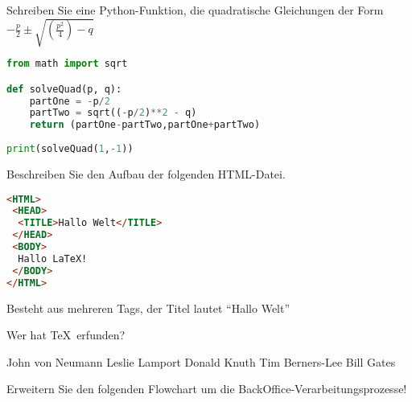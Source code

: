 \documentclass[addpoints,12pt,ngerman,answers]{exam}
\begin{document}
\begin{questions}
\question[5]
Schreiben Sie eine Python-Funktion, die quadratische Gleichungen der Form $-\frac{p}{2}\pm \sqrt{ \left(\frac{p^2}{4}\right)-q}$

\begin{solution}
\begin{lstlisting}[language=Python]
from math import sqrt

def solveQuad(p, q):
    partOne = -p/2
    partTwo = sqrt((-p/2)**2 - q)
    return (partOne-partTwo,partOne+partTwo)
 
print(solveQuad(1,-1))
\end{lstlisting}

\end{solution}

\question[5]
Beschreiben Sie den Aufbau der folgenden HTML-Datei.

\begin{lstlisting}[language={HTML},basicstyle=\ttfamily\small,identifierstyle=\color{colIdentifier},keywordstyle=\color{colKeys},stringstyle=\color{colString},commentstyle=\color{colComments}]
<HTML>
 <HEAD>
  <TITLE>Hallo Welt</TITLE>
 </HEAD>
 <BODY>
  Hallo LaTeX!
 </BODY>
</HTML>
\end{lstlisting}

\begin{solution}
Besteht aus mehreren Tags, der Titel lautet \enquote{Hallo Welt}
\end{solution}


\question[5] Wer hat \TeX\ erfunden?

\begin{checkboxes}
\choice John von Neumann
\choice Leslie Lamport
\CorrectChoice Donald Knuth
\choice Tim Berners-Lee
\choice Bill Gates
\end{checkboxes}

\newpage

\question[5]
Erweitern Sie den folgenden Flowchart um die BackOffice-Verarbeitungsprozesse!

\centering
{}
\end{questions}
\end{document}
